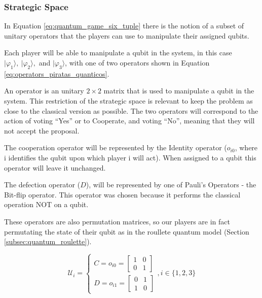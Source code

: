 \subsubsection{Strategic Space}
\label{subsec:strategic_space}

In Equation \ref{eq:quantum_game_six_tuple} there is the notion of a subset of unitary operators that the players can use to manipulate their assigned qubits. 

Each player will be able to manipulate a qubit in the system, in this case $\vert\varphi_{1}\rangle,\:\vert\varphi_{2}\rangle,$ and $\vert\varphi_{3}\rangle$, with one of two operators shown in Equation \ref{eq:operators_piratas_quanticos}. 

An operator is an unitary $2\times2$ matrix that is used to manipulate a qubit in the system.
This restriction of the strategic space is relevant to keep the problem as close to the classical version as possible. The two operators will correspond to the action of voting ``Yes'' or to Cooperate, and voting ``No'', meaning that they will not accept the proposal.  

The cooperation operator will be represented by the Identity operator ($o_{i0}$, where i identifies the qubit upon which player i will act). When assigned to a qubit this operator will leave it unchanged. 

The defection operator ($D$), will be represented by one of Pauli's Operators - the Bit-flip operator. This operator was chosen because it performs the classical operation NOT on a qubit.

These operators are also permutation matrices, so our players are in fact permutating the state of their qubit as in the roullete quantum model (Section \ref{subsec:quantum_roulette}).

\begin{equation}
\label{eq:operators_piratas_quanticos}
\mathcal{U}_{i} = \begin{cases}
C = o_{i0}=\left[\begin{array}{cc}
1 & 0\\
0 & 1
\end{array}\right]\\
D = o_{i1}=\left[\begin{array}{cc}
0 & 1\\
1 & 0
\end{array}\right]
\end{cases} , i \in \{ 1, 2, 3 \}
\end{equation}





